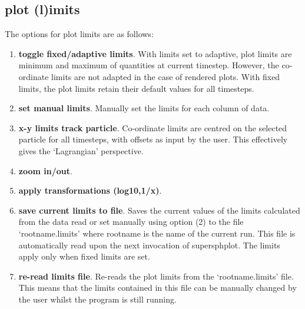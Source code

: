\documentclass[a4paper,12pt]{article}
\begin{document}
\subsection{plot (l)imits}
\label{sec:optionslimits}
 The options for plot limits are as follows:
\begin{enumerate}
\item \textbf{toggle fixed/adaptive limits}. With limits set to adaptive, plot
limits are minimum and maximum of quantities at current
timestep. However, the co-ordinate limits are not adapted in the case of
rendered plots. With fixed limits, the plot limits retain their default values
for all timesteps.
\item \textbf{set manual limits}. Manually set the limits for each column of
data.
\item \textbf{x-y limits track particle}. Co-ordinate limits are centred on the
selected particle for all timesteps, with offsets as input by the user. This
effectively gives the `Lagrangian' perspective.
\item \textbf{zoom in/out}.
\item \textbf{apply transformations (log10,1/x)}.
\item \textbf{save current limits to file}. Saves the current values of the
limits calculated from the data read or set manually using option (2) to the
file `rootname.limits' where rootname is the name of the current run. This file
is automatically read upon the next invocation of supersphplot. The limits apply
only when fixed limits are set.
\item \textbf{re-read limits file}. Re-reads the plot limits from the
`rootname.limits' file. This means that the limits contained in this file can be
manually changed by the user whilst the program is still running.
\end{enumerate}
\end{document}
